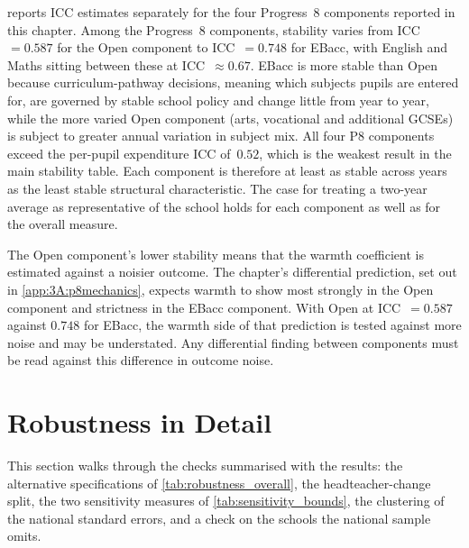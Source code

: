 

 reports ICC estimates separately for the four
Progress~8 components reported in this chapter.
Among the Progress~8 components,
stability varies from ICC~$= 0.587$ for the Open component to ICC~$= 0.748$
for EBacc, with English and Maths sitting between these at ICC~$\approx 0.67$.
EBacc is more stable than Open because curriculum-pathway decisions, meaning which subjects pupils are entered for, are governed by stable school policy and change little from year to year,
while the more varied Open component (arts, vocational and additional GCSEs) is subject to greater annual variation in subject mix. All four P8 components
exceed the per-pupil expenditure ICC of~$0.52$, which is the weakest result
in the main stability table. Each component is therefore at least as stable across years as the least stable structural characteristic. The case for treating a two-year average as representative of the school holds for each component as well as for the overall measure.

The Open component's lower stability means that the warmth coefficient is
estimated against a noisier outcome. The chapter's differential
prediction, set out in \cref{app:3A:p8mechanics}, expects warmth to show
most strongly in the Open component and strictness in the EBacc component.
With Open at ICC~$= 0.587$ against $0.748$ for EBacc, the warmth side of that prediction is tested against more noise and may be understated. Any
differential finding between components must be read against this
difference in outcome noise.



\section{Robustness in Detail}
\label{app:3A:robust}

This section walks through the checks summarised with the results: the alternative specifications of \cref{tab:robustness_overall}, the headteacher-change split, the two sensitivity measures of \cref{tab:sensitivity_bounds}, the clustering of the national standard errors, and a check on the schools the national sample omits.

